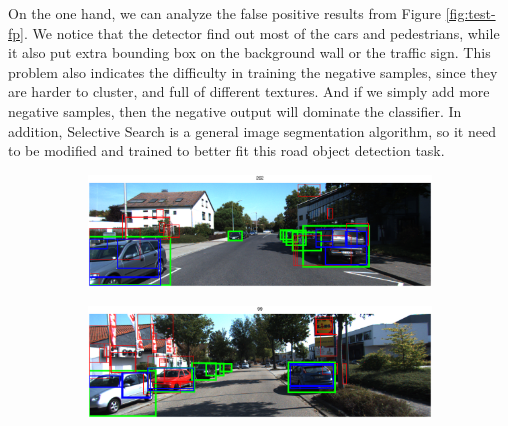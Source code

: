 \documentclass{article} %
\begin{document}
On the one hand, we can analyze the false positive results from Figure \ref{fig:test-fp}. We notice that the detector find out most of the cars and pedestrians, while it also put extra bounding box on the background wall or the traffic sign. This problem also indicates the difficulty in training the negative samples, since they are harder to cluster, and full of different textures. And if we simply add more negative samples, then the negative output will dominate the classifier. In addition, Selective Search is a general image segmentation algorithm, so it need to be modified and trained to better fit this road object detection task. 

\begin{figure}[htb]
\begin{subfigure}[b]{0.5\textwidth}
    \includegraphics[width=.9\textwidth]{test-fn1.eps}
    \label{fig:test-fn1}
\end{subfigure}
\begin{subfigure}[b]{0.5\textwidth}
    \includegraphics[width=.9\textwidth]{test-fn2.eps}
    \label{fig:test-fn2}
\end{subfigure}


\end{figure}
\end{document}
